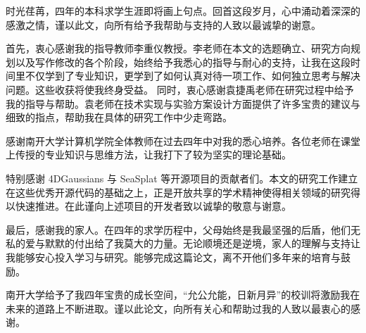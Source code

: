 
\begin{zhixie}

时光荏苒，四年的本科求学生涯即将画上句点。回首这段岁月，心中涌动着深深的感激之情，谨以此文，向所有给予我帮助与支持的人致以最诚挚的谢意。

首先，衷心感谢我的指导教师李重仪教授。李老师在本文的选题确立、研究方向规划以及写作修改的各个阶段，始终给予我悉心的指导与耐心的支持，让我在这段时间里不仅学到了专业知识，更学到了如何认真对待一项工作、如何独立思考与解决问题。这些收获将使我终身受益。
同时，衷心感谢袁捷禹老师在研究过程中给予我的指导与帮助。袁老师在技术实现与实验方案设计方面提供了许多宝贵的建议与细致的指点，帮助我在具体的研究工作中少走弯路。

感谢南开大学计算机学院全体教师在过去四年中对我的悉心培养。各位老师在课堂上传授的专业知识与思维方法，让我打下了较为坚实的理论基础。

特别感谢 4DGaussians 与 SeaSplat 等开源项目的贡献者们。本文的研究工作建立在这些优秀开源代码的基础之上，正是开放共享的学术精神使得相关领域的研究得以快速推进。在此谨向上述项目的开发者致以诚挚的敬意与谢意。

最后，感谢我的家人。在四年的求学历程中，父母始终是我最坚强的后盾，他们无私的爱与默默的付出给了我莫大的力量。无论顺境还是逆境，家人的理解与支持让我能够安心投入学习与研究。能够完成这篇论文，离不开他们多年来的培育与鼓励。

南开大学给予了我四年宝贵的成长空间，“允公允能，日新月异”的校训将激励我在未来的道路上不断进取。谨以此论文，向所有关心和帮助过我的人致以最衷心的感谢。

\end{zhixie}
